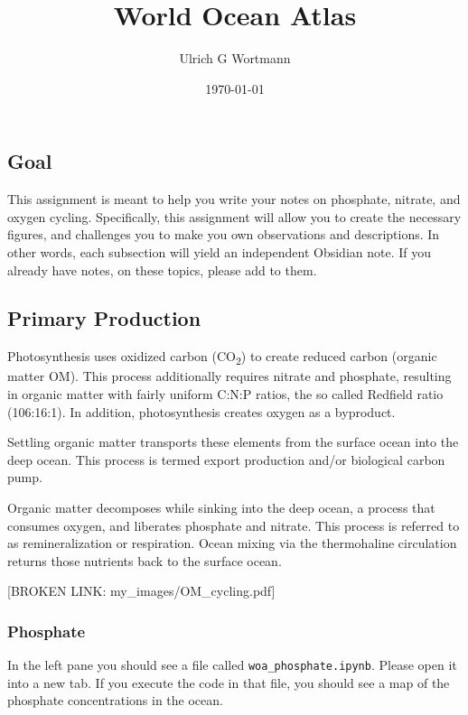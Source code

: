 \documentclass[11pt]{article}
\author{Ulrich G Wortmann}
\date{\today}
\title{World Ocean Atlas}
\begin{document}
\subsection{Goal}
\label{sec:org5466588}

This assignment is meant to help you write your notes on phosphate, nitrate, and oxygen cycling. Specifically, this assignment will allow you to create the necessary figures, and challenges you to make you own observations and descriptions. In other words, each subsection will yield an independent Obsidian note. If you already have notes, on these topics, please add to them.

\subsection{Primary Production}
\label{sec:org231136b}

Photosynthesis uses oxidized carbon (CO\textsubscript{2}) to create reduced carbon (organic matter OM). This process additionally requires nitrate and phosphate, resulting in organic matter with fairly uniform C:N:P ratios, the so called Redfield ratio (106:16:1). In addition, photosynthesis creates oxygen as a byproduct. 

Settling organic matter transports these elements from the surface ocean into the deep ocean. This process is termed export production and/or biological carbon pump.

Organic matter decomposes while sinking into the deep ocean, a 
process that consumes oxygen, and liberates phosphate and nitrate. This process is referred to as remineralization or respiration.  Ocean mixing via the thermohaline circulation returns those nutrients back to the surface ocean.

[BROKEN LINK: my\_images/OM\_cycling.pdf]

\subsubsection{Phosphate}
\label{sec:orgbe8faf7}
In the left pane you should see a file called \texttt{woa\_phosphate.ipynb}. Please open it into a new tab. If you execute the code in that file, you should see a map of the phosphate concentrations in the ocean.
\end{document}

